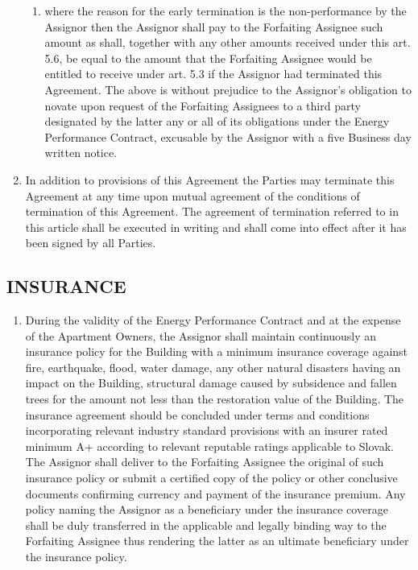 \documentclass[a4paper]{article}
\begin{document}
\begin{multicols}{2}
\begin{enumerate}
\begin{enumerate}
    \item{where the reason for the early termination is the
        non{-}performance by the Assignor then the Assignor shall pay
        to the Forfaiting Assignee such amount as shall, together with
        any other amounts received under this art. 5.6, be equal to
        the amount that the Forfaiting Assignee would be entitled to
        receive under art. 5.3 if the Assignor had terminated this
        Agreement. The above is without prejudice to the Assignor’s
        obligation to novate upon request of the Forfaiting Assignees
        to a third party designated by the latter any or all of its
        obligations under the Energy Performance Contract, excusable
        by the Assignor with a five Business day written notice.}
    \end{enumerate}

  \item{In addition to provisions of this Agreement the Parties may
      terminate this Agreement at any time upon mutual agreement of
      the conditions of termination of this Agreement. The agreement
      of termination referred to in this article shall be executed in
      writing and shall come into effect after it has been signed by
      all Parties.}
  \end{enumerate}

  \subsection{INSURANCE}

  \begin{enumerate}
  \item{During the validity of the Energy Performance Contract and at
      the expense of the Apartment Owners, the Assignor shall maintain
      continuously an insurance policy for the Building with a minimum
      insurance coverage against fire, earthquake, flood, water
      damage, any other natural disasters having an impact on the
      Building, structural damage caused by subsidence and fallen
      trees for the amount not less than the restoration value of the
      Building. The insurance agreement should be concluded under
      terms and conditions incorporating relevant industry standard
      provisions with an insurer rated minimum A+ according to
      relevant reputable ratings applicable to Slovak. The Assignor
      shall deliver to the Forfaiting Assignee the original of such
      insurance policy or submit a certified copy of the policy or
      other conclusive documents confirming currency and payment of
      the insurance premium. Any policy naming the Assignor as a
      beneficiary under the insurance coverage shall be duly
      transferred in the applicable and legally binding way to the
      Forfaiting Assignee thus rendering the latter as an ultimate
      beneficiary under the insurance policy.}


\end{enumerate}
\end{multicols}
\end{document}
